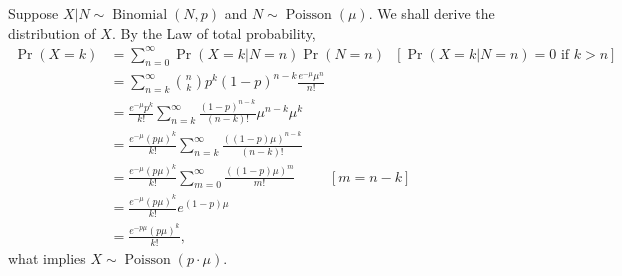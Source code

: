 \documentclass[a4paper,10pt, notitlepage]{report}
\newcommand{\pr}{\operatorname{Pr}} %
\newcommand{\Bin}{\operatorname{Binomial}}
\newcommand{\Poi}{\operatorname{Poisson}}
\begin{document}
Suppose $X|N \sim \Bin(N, p)$ and $N \sim \Poi(\mu)$. We shall derive the
distribution of $X$. By the Law of total probability, 
\begin{equation}
    \begin{split}
        \pr(X = k) &= \sum_{n=0}^{\infty} \pr(X = k|N = n)\pr(N = n) ~~~ [\pr(X = k| N = n) = 0 \text{ if } k > n] \\  
        &= \sum_{n=k}^{\infty} \binom{n}{k}p^k(1-p)^{n-k}\frac{e^{-\mu}\mu^n}{n!} \\
        &= \frac{e^{-\mu}p^k}{k!}\sum_{n=k}^{\infty} \frac{(1-p)^{n-k}}{(n-k)!}\mu^{n-k}\mu^k \\
        &= \frac{e^{-\mu}(p\mu)^k}{k!}\sum_{n=k}^{\infty} \frac{((1-p)\mu)^{n-k}}{(n-k)!} \\
        &= \frac{e^{-\mu}(p\mu)^k}{k!}\sum_{m=0}^{\infty} \frac{((1-p)\mu)^{m}}{m!} ~~~~~~~~~~~ [m = n-k] \\
        &= \frac{e^{-\mu}(p\mu)^k}{k!}e^{(1-p)\mu} \\
        &= \frac{e^{-p\mu}(p\mu)^k}{k!}, 
    \end{split}
\end{equation}
what implies $X \sim \Poi(p\cdot\mu)$.



\end{document}
